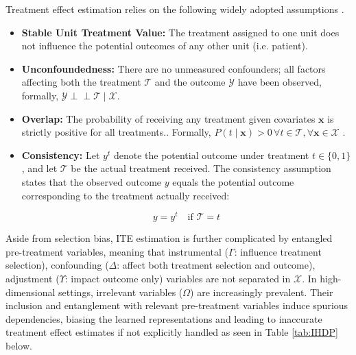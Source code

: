 \documentclass[doubleblind]{ecai}
\begin{document}
	
	 Treatment effect estimation relies on the following widely adopted assumptions \citep{PaulRD,assumptions,Imbens}. %
	\begin{itemize}
		\item \textbf{Stable Unit Treatment Value:} The treatment assigned to one unit does not influence the potential outcomes of any other unit (i.e. patient).
		\item \textbf{Unconfoundedness:} There are no unmeasured confounders; all factors affecting both the treatment $\mathcal{T}$ and the outcome $\mathcal{Y}$ have been observed, formally, $\mathcal{Y} \perp\!\!\!\perp \mathcal{T} \mid \mathcal{X} $.
		
		\item \textbf{Overlap:} The probability of receiving any treatment given covariates $\mathbf{x}$ is strictly positive for all treatments.. Formally, $P({t} \mid \mathbf{x}) > 0  \, \forall t \in \mathcal{T}, \forall \mathbf{x} \in \mathcal{X} $ \citep{Rubin}.
		\item \textbf{Consistency:} Let \( y^t \) denote the potential outcome under treatment \( t \in \{0, 1\} \), and let \( \mathcal{T} \) be the actual treatment received. The consistency assumption states that the observed outcome \( y \) equals the potential outcome corresponding to the treatment actually received:
		
		\[
		y = y^t \quad \text{if } \mathcal{T}  = t
		\]
	\end{itemize}
	Aside from selection bias, ITE estimation is further complicated by entangled pre-treatment variables, meaning that instrumental ($\Gamma$: influence treatment selection), confounding ($\Delta$: affect both treatment selection and outcome), adjustment ($\Upsilon$: impact outcome only) variables are not separated in $\mathcal{X}$. In high-dimensional settings, irrelevant variables ($\Omega$) are increasingly prevalent. Their inclusion and entanglement with relevant pre-treatment variables induce spurious dependencies, biasing the learned representations and leading to inaccurate treatment effect estimates if not explicitly handled \citep{Decomp,Khan2024OnTE} as seen in Table \ref{tab:IHDP} below.
	
	
	
\end{document}
